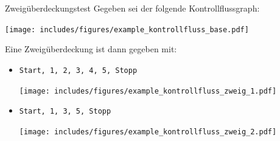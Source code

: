 \begin{example}{Zweigüberdeckungstest}
    Gegeben sei der folgende Kontrollflussgraph:
    \begin{center}
        \texttt{[image: includes/figures/example\_kontrollfluss\_base.pdf]}
    \end{center}

    Eine Zweigüberdeckung ist dann gegeben mit:
    \begin{itemize}
        \item \texttt{Start, 1, 2, 3, 4, 5, Stopp}

              \vspace{1em}
              \begin{center}
                  \texttt{[image: includes/figures/example\_kontrollfluss\_zweig\_1.pdf]}
              \end{center}
        \item \texttt{Start, 1, 3, 5, Stopp}

              \vspace{1em}
              \begin{center}
                  \texttt{[image: includes/figures/example\_kontrollfluss\_zweig\_2.pdf]}
              \end{center}
    \end{itemize}
\end{example}


